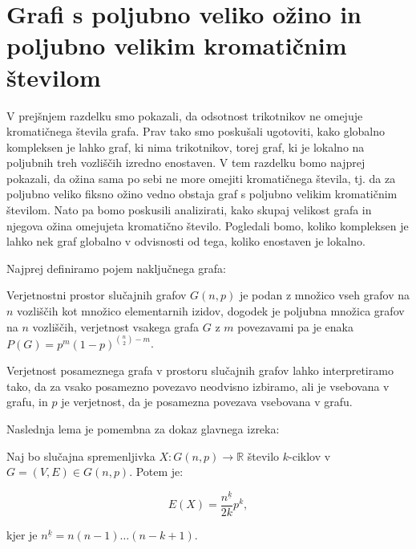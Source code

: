 \documentclass[mat1, tisk]{fmfdelo}
\begin{document}
\section{Grafi s poljubno veliko ožino in poljubno velikim kromatičnim številom}
V prejšnjem razdelku smo pokazali, da odsotnost trikotnikov ne omejuje kromatičnega števila grafa. Prav tako smo poskušali ugotoviti, kako globalno kompleksen je lahko graf, ki nima trikotnikov, torej graf,
ki je lokalno na poljubnih treh vozliščih izredno enostaven. V tem razdelku bomo najprej pokazali, da ožina sama po sebi ne more omejiti kromatičnega števila, tj. da za poljubno veliko fiksno ožino vedno obstaja
graf s poljubno velikim kromatičnim številom. Nato pa bomo poskusili analizirati, kako skupaj velikost grafa in njegova ožina omejujeta kromatično število. Pogledali bomo, koliko kompleksen je lahko nek graf globalno 
v odvisnosti od tega, koliko enostaven je lokalno.

Najprej definiramo pojem naključnega grafa:

    \begin{definicija}
        Verjetnostni prostor slučajnih grafov $G(n, p)$ je podan z množico vseh grafov na $n$ vozliščih kot množico elementarnih izidov, dogodek je poljubna množica grafov na $n$ vozliščih, verjetnost vsakega grafa $G$
        z $m$ povezavami pa je enaka $P(G) = p^m(1 - p)^{\binom{n}{2}-m}$.
    \end{definicija}

    \begin{opomba}
        Verjetnost posameznega grafa v prostoru slučajnih grafov lahko interpretiramo tako, da za vsako posamezno povezavo neodvisno izbiramo, ali je vsebovana v grafu, in $p$ je verjetnost, da je posamezna povezava vsebovana v grafu.
    \end{opomba}

Naslednja lema je pomembna za dokaz glavnega izreka:

    \begin{lema}
        Naj bo slučajna spremenljivka $X : G(n, p) \to \mathbb{R}$ število $k$-ciklov v $G = (V, E) \in G(n, p)$. Potem je:

        $$E(X) = \frac{n^{\underline{k}}}{2k}p^k,$$

        kjer je $n^{\underline{k}} = n(n-1)\ldots(n-k+1)$.
    \end{lema}
\end{document}
